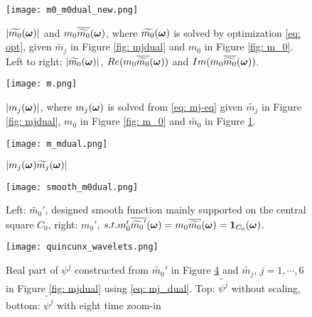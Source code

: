 \begin{figure}
\centering
\texttt{[image: m0\_m0dual\_new.png]}
\caption{$|\widetilde{m_{0}}(\boldsymbol{\omega})|$ and $m_0\overline{\widetilde{m_{0}}}(\boldsymbol{\omega})$, where $\widetilde{m_{0}}(\boldsymbol{\omega})$ is solved by optimization \eqref{eq: opt}, given $\widetilde{m_j}$ in Figure \ref{fig: mjdual} and $m_0$ in Figure \ref{fig: m_0}. Left to right: $|\widetilde{m_{0}}(\boldsymbol{\omega})|$, $Re(m_0\overline{\widetilde{m_{0}}}(\boldsymbol{\omega}))$ and $Im(m_0\overline{\widetilde{m_{0}}}(\boldsymbol{\omega}))$. }
\label{fig: m_0_m0dual}
\end{figure}

\begin{figure}
\centering
\texttt{[image: m.png]}
\caption{ $|m_j(\boldsymbol{\omega})|$, where $m_j(\boldsymbol{\omega})$ is solved from \eqref{eq: mj-eq} given $\widetilde{m_j}$ in Figure \ref{fig: mjdual}, $m_0$ in Figure \ref{fig: m_0} and $\widetilde{m_0}$ in Figure \ref{fig: m_0_m0dual}. }
\label{fig: m_j}
\end{figure}

\begin{figure}
\centering
\texttt{[image: m\_mdual.png]}
\caption{ $|m_j(\boldsymbol{\omega})\widetilde{m_{j}}(\boldsymbol{\omega})|$ }
\label{fig: m_j_mjdual}
\end{figure}

\begin{figure}
\centering
\texttt{[image: smooth\_m0dual.png]}
\caption{ Left: $\widetilde{m_0}'$, designed smooth function mainly supported on the central square $C_0$, right: $m_0'$, $s.t. m_0'\overline{\widetilde{m_0}'}(\boldsymbol{\omega})  =  m_0\overline{\widetilde{m_0}}(\boldsymbol{\omega})= \boldsymbol{1}_{C_0}(\boldsymbol{\omega})$. } 
\label{fig: smooth_m0dual}
\end{figure}

\begin{figure}
\centering
\texttt{[image: quincunx\_wavelets.png]}
\caption{ Real part of $\psi^j$ constructed from $\widetilde{m_0}'$ in Figure \ref{fig: smooth_m0dual} and $\widetilde{m_j},\, j=1,\cdots, 6$ in Figure \ref{fig: mjdual} using \eqref{eq: mj_dual}. Top: $\widetilde{\psi^j}$ without scaling, bottom: $\widetilde{\psi^j}$ with eight time zoom-in } 
\label{fig: wavelets}
\end{figure}


